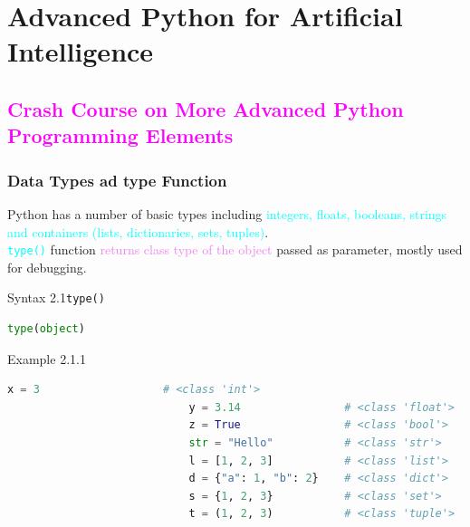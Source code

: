 \documentclass{book}
\begin{document}
\chapter{Advanced Python for Artificial Intelligence}
\textcolor{magenta}{\section{\textbf{Crash Course on More Advanced Python Programming Elements}}}
    \subsection{Data Types ad type Function}
    Python has a number of basic types including \textcolor{cyan}{integers, floats, booleans, strings and containers (lists, dictionaries, sets, tuples)}.\\
    \textcolor{cyan}{\texttt{type()}} function \textcolor{violet}{returns class type of the object} passed as parameter, mostly used for debugging.
    \begin{synBox}[]{Syntax 2.1}{\texttt{type()}}
        \begin{lstlisting}[language=Python, basicstyle=\ttfamily\small, keywordstyle=\color{blue}, commentstyle=\color{forestgreen}, stringstyle=\color{red}, showstringspaces=false]
                                        type(object)
        \end{lstlisting}
    \end{synBox}
    \begin{egBox}[]{Example 2.1.1}{}
        \begin{lstlisting}[language=Python, basicstyle=\ttfamily\small, keywordstyle=\color{blue}, commentstyle=\color{forestgreen}, stringstyle=\color{red}, showstringspaces=false]
                            x = 3                   # <class 'int'>
                            y = 3.14                # <class 'float'>
                            z = True                # <class 'bool'>
                            str = "Hello"           # <class 'str'>
                            l = [1, 2, 3]           # <class 'list'>
                            d = {"a": 1, "b": 2}    # <class 'dict'>
                            s = {1, 2, 3}           # <class 'set'>
                            t = (1, 2, 3)           # <class 'tuple'>
        \end{lstlisting}
    \end{egBox}
\end{document}
